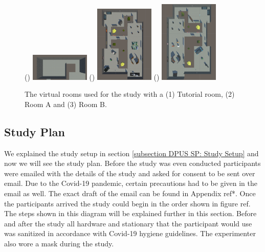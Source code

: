 \begin{figure}[]
	()
	\includegraphics[width=0.25\textwidth]{images/tutorial-room.pdf}
	()
	\includegraphics[width=0.25\textwidth]{images/museum-1-objects.pdf}
	()
	\includegraphics[width=0.25\textwidth]{images/museum-2-objects.pdf}
	\caption{The virtual rooms used for the study with a (1) Tutorial room, (2) Room A and (3) Room B.}
	\label{fig:study-environment}
\end{figure}

\subsection{Study Plan}
\label{subsection DPUS SP: Study Plan}
We explained the study setup in section \ref{subsection DPUS SP: Study Setup} and now we will see the study plan. Before the study was even conducted participants were emailed with the details of the study and asked for consent to be sent over email. Due to the Covid-19 pandemic, certain precautions had to be given in the email as well. The exact draft of the email can be found in Appendix ref*. Once the participants arrived the study could begin in the order shown in figure ref. The steps shown in this diagram will be explained further in this section. Before and after the study all hardware and stationary that the participant would use was sanitized in accordance with Covid-19 hygiene guidelines. The experimenter also wore a mask during the study.

